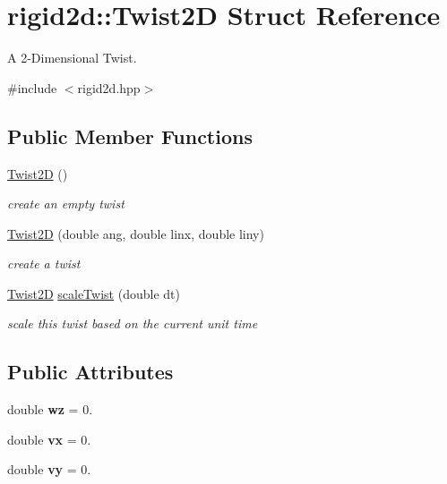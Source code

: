 \hypertarget{structrigid2d_1_1Twist2D}{}\section{rigid2d\+:\+:Twist2D Struct Reference}
\label{structrigid2d_1_1Twist2D}


A 2-\/\+Dimensional Twist.  




{\ttfamily \#include $<$rigid2d.\+hpp$>$}

\subsection*{Public Member Functions}
\begin{DoxyCompactItemize}
\item 
\mbox{\label{structrigid2d_1_1Twist2D_a8a317315c9dc111b01e0f3c53af072b4}} 
\hyperlink{structrigid2d_1_1Twist2D_a8a317315c9dc111b01e0f3c53af072b4}{Twist2D} ()
\begin{DoxyCompactList}\small\item\em create an empty twist \end{DoxyCompactList}\item 
\hyperlink{structrigid2d_1_1Twist2D_a957e7c727d48e4d2b3f6c2390533e1bb}{Twist2D} (double ang, double linx, double liny)
\begin{DoxyCompactList}\small\item\em create a twist \end{DoxyCompactList}\item 
\hyperlink{structrigid2d_1_1Twist2D}{Twist2D} \hyperlink{structrigid2d_1_1Twist2D_ad5fb3449c63fceb7519c89ac84d3546e}{scale\+Twist} (double dt)
\begin{DoxyCompactList}\small\item\em scale this twist based on the current unit time \end{DoxyCompactList}\end{DoxyCompactItemize}
\subsection*{Public Attributes}
\begin{DoxyCompactItemize}
\item 
\mbox{\label{structrigid2d_1_1Twist2D_ad556d2a04f31e2c5d8f4b45484782429}} 
double {\bfseries wz} = 0.
\item 
\mbox{\label{structrigid2d_1_1Twist2D_a95d7a5655df76416261f48346f549700}} 
double {\bfseries vx} = 0.
\item 
\mbox{\label{structrigid2d_1_1Twist2D_abe86f0f1d0c00e42e5b388ca676e43dd}} 
double {\bfseries vy} = 0.
\end{DoxyCompactItemize}


